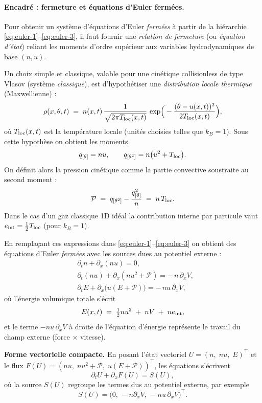 \begin{mdframed}[
	linewidth=0.5pt, 
	backgroundcolor=gray!5, 
	roundcorner=50pt,	
	innerleftmargin=5pt,
    innerrightmargin=5pt,
    innertopmargin=-10pt,
    innerbottommargin=2pt,
    leftmargin=2pt,
    rightmargin=2pt
	]
\paragraph{Encadré : fermeture et équations d'Euler fermées.}
Pour obtenir un système d'équations d'Euler \emph{fermées} à partir de la hiérarchie \eqref{eq:euler-1}--\eqref{eq:euler-3}, il faut fournir une \emph{relation de fermeture} (ou \emph{équation d'état}) reliant les moments d'ordre supérieur aux variables hydrodynamiques de base $(n,u)$.

Un choix simple et classique, valable pour une cinétique collisionless de type Vlasov (système \emph{classique}), est d'hypothétiser une \emph{distribution locale thermique} (Maxwellienne) :
\[
\rho(x,\theta,t) \;=\; n(x,t)\,\frac{1}{\sqrt{2\pi T_{\rm loc}(x,t)}}\,
\exp\!\Big(-\frac{(\theta-u(x,t))^2}{2T_{\rm loc}(x,t)}\Big),
\]
où $T_{\rm loc}(x,t)$ est la température locale (unités choisies telles que $k_B=1$). Sous cette hypothèse on obtient les moments
\[
q_{[\theta]} = n u,\qquad
q_{[\theta^2]} = n\big(u^2 + T_{\rm loc}\big).
\]
On définit alors la pression cinétique comme la partie convective soustraite au second moment :
\[
\mathcal{P} \;=\; q_{[\theta^2]} - \frac{q_{[\theta]}^2}{n} \;=\; n\,T_{\rm loc}.
\]
Dans le cas d'un gaz classique 1D idéal la contribution interne par particule vaut $e_{\rm int} = \tfrac{1}{2}T_{\rm loc}$ (pour $k_B=1$).

En remplaçant ces expressions dans \eqref{eq:euler-1}--\eqref{eq:euler-3} on obtient des équations d'Euler \emph{fermées} avec les sources dues au potentiel externe :
\begin{align*}
&\partial_t n + \partial_x(n u) = 0, \\
&\partial_t (n u) + \partial_x(n u^2 + \mathcal{P}) = -\,n\,\partial_x V, \\
&\partial_t E + \partial_x\big(u(E+\mathcal{P})\big) = -\,n u\,\partial_x V,
\end{align*}
où l'énergie volumique totale s'écrit
\[
E(x,t) \;=\; \tfrac12 n u^2 \;+\; n V \;+\; n e_{\rm int},
\]
et le terme $-n u\,\partial_x V$ à droite de l'équation d'énergie représente le travail du champ externe (force × vitesse).

\medskip

\noindent\textbf{Forme vectorielle compacte.} En posant l'état vectoriel $U=(n,\; n u,\; E)^\top$ et le flux $F(U)=(n u,\; n u^2 + \mathcal{P},\; u(E+\mathcal{P}))^\top$, les équations s'écrivent
\[
\partial_t U + \partial_x F(U) = S(U),
\]
où la source $S(U)$ regroupe les termes dus au potentiel externe, par exemple
\[
S(U) = \big(0,\,-n\partial_x V,\,-n u\,\partial_x V\big)^\top .
\]


\end{mdframed}
